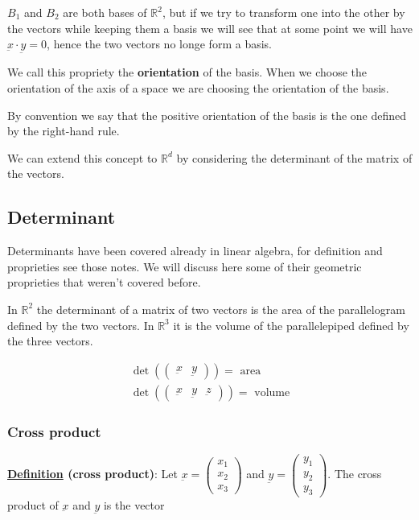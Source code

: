 \documentclass[10pt]{extarticle}
\newcommand{\R}{\mathbb{R}}
\newcommand{\munderbar}[1]{\underbar{\ensuremath{#1}}}
\begin{document}
$B_1$ and $B_2$ are both bases of $\R^2$, but if we try to  transform one into the other by  the vectors
while keeping them a basis we will see that at some point we will have $\munderbar{x} \cdot \munderbar{y} = 0$,
hence the two vectors no longe form a basis.

We call this propriety the \textbf{orientation} of the basis.
When we choose the orientation of the axis of a space we are choosing the orientation of the basis.

By convention we say that the positive orientation of the basis is the one defined by the right-hand rule.

We can extend this concept to $\R^d$ by considering the determinant of the matrix of the vectors.

\subsection{Determinant}

Determinants have been covered already in linear algebra, for definition and proprieties see those notes.
We will discuss here some of their geometric proprieties that weren't covered before.

In $\R^2$ the determinant of a matrix of two vectors is the area of the parallelogram defined by the two vectors.
In $\R^3$ it is the volume of the parallelepiped defined by the three vectors.

\begin{gather*}
    \det \left( \begin{pmatrix}
            \munderbar{x} & \munderbar{y}
        \end{pmatrix} \right) = \text{ area} \\
    \det \left( \begin{pmatrix}
            \munderbar{x} & \munderbar{y} & \munderbar{z}
        \end{pmatrix} \right) = \text{ volume}
\end{gather*}

\subsubsection{Cross product}

\textbf{\underline{Definition} (cross product)}: Let $\munderbar{x} = \begin{pmatrix}
        x_1 \\ x_2 \\ x_3
    \end{pmatrix}$ and $\munderbar{y} = \begin{pmatrix}
        y_1 \\ y_2 \\ y_3
    \end{pmatrix}$.
The cross product of $\munderbar{x}$ and $\munderbar{y}$ is the vector
\end{document}
